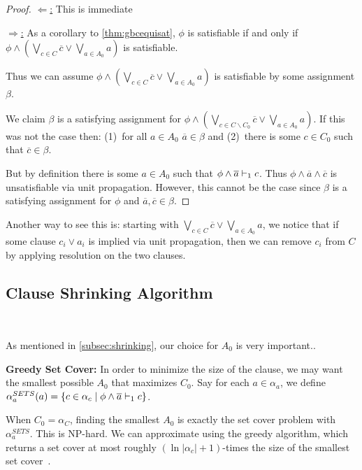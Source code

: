 \begin{proof}
    \underline{$\Leftarrow$:} This is immediate


    \underline{$\Rightarrow$:}  As a corollary to \autoref{thm:gbcequisat},
    $\phi$ is satisfiable if and only if $\phi \land (\bigvee_{c \in C}
    \overline{c} \lor \bigvee_{a \in A_0} a)$ is satisfiable.

    Thus we can assume $\phi \land (\bigvee_{c \in C} \overline{c} \lor
    \bigvee_{a \in A_0} a)$ is satisfiable by some assignment
    $\beta$.

    We claim $\beta$ is a satisfying assignment for $\phi \land (\bigvee_{c \in
    C \backslash C_0} \overline{c} \lor \bigvee_{a \in A_0} a)$. If this was not
    the case then: (1)~for all $a \in A_0$ $\overline{a} \in \beta$ and (2)~there
    is some $c \in C_0$ such that $\overline{c} \in \beta$. 

    But by definition there is some $a \in A_0$ such that
    $\phi \land \overline{a} \vdash_1 c$. Thus $\phi \land \overline{a} \land
    \overline{c}$ is unsatisfiable via unit propagation. However, this cannot be
    the case since $\beta$ is a satisfying assignment for $\phi$ and
    $\overline{a}, \overline{c} \in \beta$.
\end{proof}

Another way to see this is: starting with $\bigvee_{c \in C} \overline{c} \lor
\bigvee_{a \in A_0} a$, we notice that if some clause $c_i \lor a_i$ is implied
via unit propagation, then we can remove $c_i$ from $C$ by applying resolution
on the two clauses.

\subsection{Clause Shrinking Algorithm}~\label{subsec:sym}

As mentioned in \autoref{subsec:shrinking}, our choice for $A_0$ is very important.. 


\noindent \textbf{Greedy Set Cover:} %
In order to minimize the size of the clause, we may want the smallest possible $A_0$ that maximizes $C_0$. Say for each $a \in \alpha_a$, we define $\alpha_a^{SETS}(a) = \{ c \in \alpha_c \; | \; \phi \land \overline{a} \vdash_1 c\}$. 

When $C_0 = \alpha_C$, finding the smallest $A_0$ is exactly the set cover problem with $\alpha_a^{SETS}$. This is NP-hard. We can approximate using the greedy algorithm, which returns a set cover at most roughly $(\ln |\alpha_c| + 1)$-times the size of the smallest set cover~\cite{greedysetcover}. 


